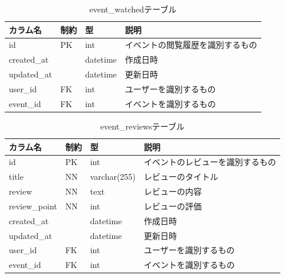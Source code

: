 \begin{table}[H]
  \centering
  \caption{event\_watchedテーブル}
  \label{tab:db-event-watched}
  \begin{tabular}{|l|l|l|l|} \hline
    カラム名        & 制約 & 型        & 説明               \\ \hline \hline
    id          & PK & int      & イベントの閲覧履歴を識別するもの \\ \hline
    created\_at &    & datetime & 作成日時             \\ \hline
    updated\_at &    & datetime & 更新日時             \\ \hline
    user\_id    & FK & int      & ユーザーを識別するもの      \\ \hline
    event\_id   & FK & int      & イベントを識別するもの      \\ \hline
  \end{tabular}
\end{table}

\begin{table}[H]
  \centering
  \caption{event\_reviewsテーブル}
  \label{tab:db-event-reviews}
  \begin{tabular}{|l|l|l|l|} \hline
    カラム名          & 制約 & 型            & 説明               \\ \hline \hline
    id            & PK & int          & イベントのレビューを識別するもの \\ \hline
    title         & NN & varchar(255) & レビューのタイトル        \\ \hline
    review        & NN & text         & レビューの内容          \\ \hline
    review\_point & NN & int          & レビューの評価          \\ \hline
    created\_at   &    & datetime     & 作成日時             \\ \hline
    updated\_at   &    & datetime     & 更新日時             \\ \hline
    user\_id      & FK & int          & ユーザーを識別するもの      \\ \hline
    event\_id     & FK & int          & イベントを識別するもの      \\ \hline
  \end{tabular}
\end{table}

